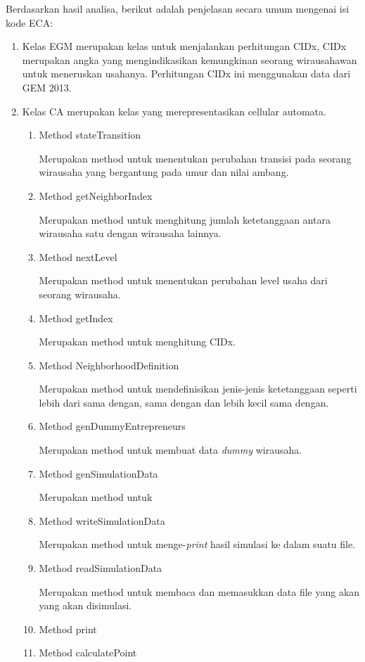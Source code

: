 	Berdasarkan hasil analisa, berikut adalah penjelasan secara umum mengenai isi kode ECA:
\begin{enumerate}
	\item Kelas EGM merupakan kelas untuk menjalankan perhitungan CIDx, CIDx merupakan angka yang mengindikasikan kemungkinan seorang wirausahawan untuk meneruskan usahanya. Perhitungan CIDx ini menggunakan data dari GEM 2013.
	\item Kelas CA merupakan kelas yang merepresentasikan cellular automata.
		\begin{enumerate}
			\item Method stateTransition
			
			Merupakan method untuk menentukan perubahan transisi pada seorang wirausaha yang bergantung pada umur dan nilai ambang.
			\item Method getNeighborIndex
			
			Merupakan method untuk menghitung jumlah ketetanggaan antara wirausaha satu dengan wirausaha lainnya.
			\item Method nextLevel
			
			Merupakan method untuk menentukan perubahan level usaha dari seorang wirausaha.
			
			\item Method getIndex
			
			Merupakan method untuk menghitung CIDx.
			
			\item Method NeighborhoodDefinition
			
			Merupakan method untuk mendefinisikan jenis-jenis ketetanggaan seperti lebih dari sama dengan, sama dengan dan lebih kecil sama dengan.
			
			\item Method genDummyEntrepreneurs
			
			Merupakan method untuk membuat data \textit{dummy} wirausaha.
			\item Method genSimulationData
			
			Merupakan method untuk 
			\item Method writeSimulationData
			
			Merupakan method untuk menge-\textit{print} hasil simulasi ke dalam suatu file.
			\item Method readSimulationData
			
			Merupakan method untuk membaca dan memasukkan data file yang akan yang akan disimulasi.
			\item Method print
			\item Method calculatePoint
			

\end{enumerate}
\end{enumerate}
